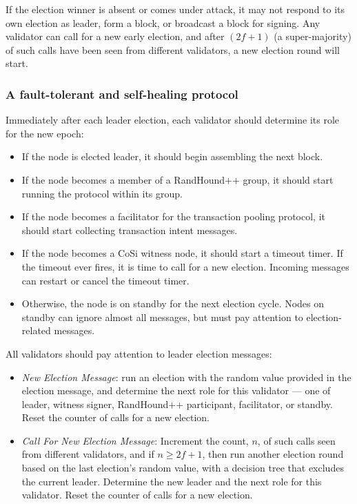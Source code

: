 \documentclass[a4paper, 10pt, conference]{ieeeconf}
\begin{document}
If the election winner is absent or comes under attack, it may not respond to its own election as leader, form a block, or broadcast a block for signing. Any validator can call for a new early election, and after $(2 f+1)$ (a super-majority) of such calls have been seen from different validators, a new election round will start.

\subsubsection{A fault-tolerant and self-healing protocol} Immediately after each leader election, each validator should determine its role for the new epoch:

\begin{itemize}
	\item If the node is elected leader, it should begin assembling the next block. 
	\item If the node becomes a member of a RandHound++ group, it should start running the protocol within its group.
	\item If the node becomes a facilitator for the transaction pooling protocol, it should start collecting transaction intent messages.
	\item If the node becomes a CoSi witness node, it should start a timeout timer. If the timeout ever fires, it is time to call for a new election. Incoming messages can restart or cancel the timeout timer.
	\item Otherwise, the node is on standby for the next election cycle. Nodes on standby can ignore almost all messages, but must pay attention to election-related messages.
\end{itemize}  

All validators should pay attention to leader election messages:

\begin{itemize}
	\item{\textit{New Election Message}: run an election with the random value provided in the election message, and determine the next role for this validator --- one of leader, witness signer, RandHound++ participant, facilitator, or standby. Reset the counter of calls for a new election.}
	\item{\textit{Call For New Election Message}: Increment the count, $n$, of such calls seen from different validators, and if $n \ge 2 f +1$, then run another election round based on the last election's random value, with a decision tree that excludes the current leader. Determine the new leader and the next role for this validator. Reset the counter of calls for a new election.}
\end{itemize}
\end{document}
